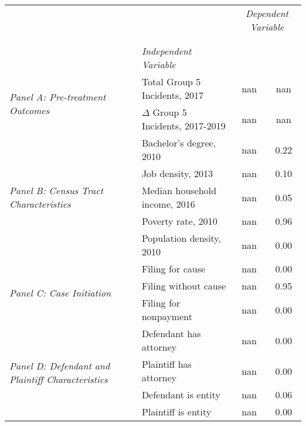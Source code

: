 \begin{tabular}{llcc}
\toprule
 &  & \multicolumn{2}{c}{\textit{Dependent Variable}} \\
\cline{3-4}
\\
 &  &  &  \\
 & \emph{Independent Variable} &  &  \\
\midrule
\multirow[c]{2}{3cm}{\textit{Panel A: Pre-treatment Outcomes}} & Total Group 5 Incidents, 2017 & nan & nan \\
 & $\Delta$ Group 5 Incidents, 2017-2019 & nan & nan \\
\cline{1-4}
\multirow[c]{5}{3cm}{\textit{Panel B: Census Tract Characteristics}} & Bachelor's degree, 2010 & nan & 0.22 \\
 & Job density, 2013 & nan & 0.10 \\
 & Median household income, 2016 & nan & 0.05 \\
 & Poverty rate, 2010 & nan & 0.96 \\
 & Population density, 2010 & nan & 0.00 \\
\cline{1-4}
\multirow[c]{3}{3cm}{\textit{Panel C: Case Initiation}} & Filing for cause & nan & 0.00 \\
 & Filing without cause & nan & 0.95 \\
 & Filing for nonpayment & nan & 0.00 \\
\cline{1-4}
\multirow[c]{4}{3cm}{\textit{Panel D: Defendant and Plaintiff Characteristics}} & Defendant has attorney & nan & 0.00 \\
 & Plaintiff has attorney & nan & 0.00 \\
 & Defendant is entity & nan & 0.06 \\
 & Plaintiff is entity & nan & 0.00 \\
\cline{1-4}
\bottomrule
\end{tabular}
